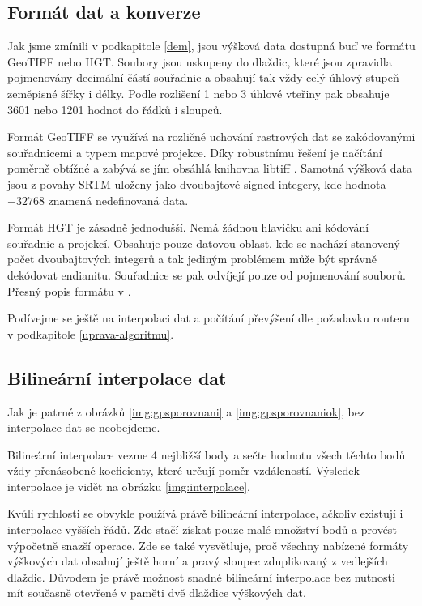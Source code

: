 \documentclass[thesis=B,czech]{FITthesis}[2012/06/26]
\begin{document}
\subsection{Formát dat a konverze}

Jak jsme zmínili v podkapitole \ref{dem}, jsou výšková data dostupná buď ve formátu GeoTIFF nebo HGT. Soubory jsou uskupeny do dlaždic, které jsou zpravidla pojmenovány decimální částí souřadnic a obsahují tak vždy celý úhlový stupeň zeměpisné šířky i délky. Podle rozlišení 1 nebo 3 úhlové vteřiny pak obsahuje 3601 nebo 1201 hodnot do řádků i sloupců.

Formát GeoTIFF se využívá na rozličné uchování rastrových dat se zakódovanými souřadnicemi a typem mapové projekce. Díky robustnímu řešení je načítání poměrně obtížné a zabývá se jím obsáhlá knihovna libtiff \cite{libtiff}. Samotná výšková data jsou z povahy SRTM uloženy jako dvoubajtové signed integery, kde hodnota $-32768$ znamená nedefinovaná data.

Formát HGT je zásadně jednodušší. Nemá žádnou hlavičku ani kódování souřadnic a projekcí. Obsahuje pouze datovou oblast, kde se nachází stanovený počet dvoubajtových integerů a tak jediným problémem může být správně dekódovat endianitu. Souřadnice se pak odvíjejí pouze od pojmenování souborů. Přesný popis formátu v \cite{srtm-manual}. 

Podívejme se ještě na interpolaci dat a počítání převýšení dle požadavku routeru v podkapitole \ref{uprava-algoritmu}.


\subsection{Bilineární interpolace dat}
Jak je patrné z obrázků \ref{img:gpsporovnani} a \ref{img:gpsporovnaniok}, bez interpolace dat se neobejdeme. 

Bilineární interpolace vezme 4 nejbližší body a sečte hodnotu všech těchto bodů vždy přenásobené koeficienty, které určují poměr vzdáleností. Výsledek interpolace je vidět na obrázku \ref{img:interpolace}.


Kvůli rychlosti se obvykle používá právě bilineární interpolace, ačkoliv existují i interpolace vyšších řádů. Zde stačí získat pouze malé množství bodů a provést výpočetně snazší operace. Zde se také vysvětluje, proč všechny nabízené formáty výškových dat obsahují ještě horní a pravý sloupec zduplikovaný z vedlejších dlaždic. Důvodem je právě možnost snadné bilineární interpolace bez nutnosti mít současně otevřené v paměti dvě dlaždice výškových dat.
\end{document}
